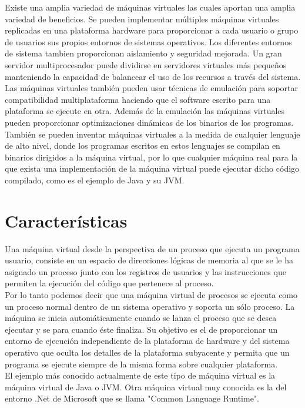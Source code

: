 \documentclass[10pt,a4paper,spanish]{report}
\begin{document}
  \noindent
  Existe una amplia variedad de máquinas virtuales las cuales aportan una amplia variedad de beneficios. Se pueden implementar múltiples máquinas virtuales replicadas en una plataforma hardware para proporcionar a cada usuario o grupo de usuarios sus propios entornos de sistemas operativos. Los diferentes entornos de sistema tambien proporcionan aislamiento y seguridad mejorada. Un gran servidor multiprocesador puede dividirse en servidores virtuales más pequeños manteniendo la capacidad de balancear el uso de los recursos a través del sistema. Las máquinas virtuales también pueden usar técnicas de emulación para soportar compatibilidad multiplataforma haciendo que el software escrito para una plataforma se ejecute en otra. Además de la emulación las máquinas virtuales pueden proporcionar optimizaciones dinámicas de los binarios de los programas. También se pueden inventar máquinas virtuales a la medida de cualquier lenguaje de alto nivel, donde los programas escritos en estos lenguajes se compilan en binarios dirigidos a la máquina virtual, por lo que cualquier máquina real para la que exista una implementación de la máquina virtual puede ejecutar dicho código compilado, como es el ejemplo de Java y su JVM.

  \chapter{Características}

  \noindent
  Una máquina virtual desde la perspectiva de un proceso que ejecuta un programa usuario, consiste en un espacio de direcciones lógicas de memoria al que se le ha asignado un proceso junto con los registros de usuarios y las instrucciones que permiten la ejecución del código que pertenece al proceso. \\

  \noindent
  Por lo tanto podemos decir que una máquina virtual de procesos se ejecuta como un proceso normal dentro de un sistema operativo y soporta un sólo proceso. La máquina se inicia automáticamente cuando se lanza el proceso que se desea ejecutar y se para cuando éste finaliza. Su objetivo es el de proporcionar un entorno de ejecución independiente de la plataforma de hardware y del sistema operativo que oculta los detalles de la plataforma subyacente y permita que un programa se ejecute siempre de la misma forma sobre cualquier plataforma.\\

  \noindent
  El ejemplo más conocido actualmente de este tipo de máquina virtual es la máquina virtual de Java o JVM. Otra máquina virtual muy conocida es la del entorno .Net de Microsoft que se llama "Common Language Runtime". \\
\end{document}
